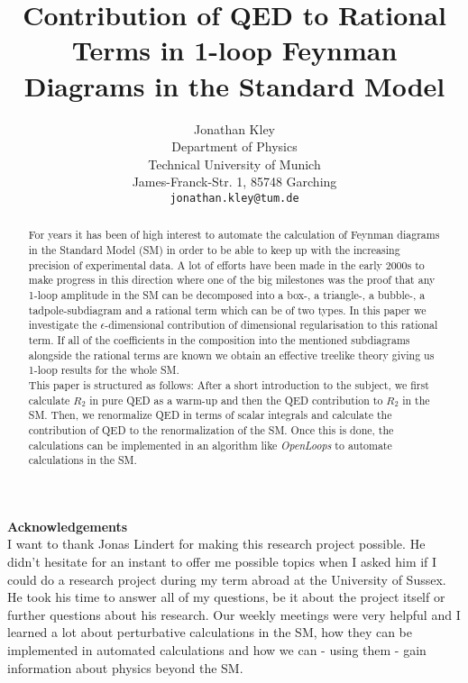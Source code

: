 \documentclass{article}
\title{Contribution of QED to Rational Terms in 1-loop Feynman Diagrams in the Standard Model}
\author{
  Jonathan Kley \\
  Department of Physics\\
  Technical University of Munich\\
  James-Franck-Str. 1, 85748 Garching \\
  \texttt{jonathan.kley@tum.de} \\
}
\numberwithin{equation}{section} %
\begin{document}
\maketitle

\begin{abstract}
For years it has been of high interest to automate the calculation of Feynman diagrams in the Standard Model (SM) in order to be able to keep up with the increasing precision of experimental data. A lot of efforts have been made in the early 2000s to make progress in this direction where one of the big milestones was the proof that any 1-loop amplitude in the SM can be decomposed into a box-, a triangle-, a bubble-, a tadpole-subdiagram and a rational term which can be of two types. In this paper we investigate the $\epsilon$-dimensional contribution of dimensional regularisation to this rational term. If all of the coefficients in the composition into the mentioned subdiagrams alongside the rational terms are known we obtain an effective treelike theory giving us 1-loop results for the whole SM. \\
This paper is structured as follows: After a short introduction to the subject, we first calculate $R_2$ in pure QED as a warm-up and then the QED contribution to $R_2$ in the SM. Then, we renormalize QED in terms of scalar integrals and calculate the contribution of QED to the renormalization of the SM. Once this is done, the calculations can be implemented in an algorithm like \textit{OpenLoops} to automate calculations in the SM.\end{abstract}



\newpage
\tableofcontents
\newpage





{\bf\Large Acknowledgements} \\

I want to thank Jonas Lindert for making this research project possible. He didn't hesitate for an instant to offer me possible topics when I asked him if I could do a research project during my term abroad at the University of Sussex. He took his time to answer all of my questions, be it about the project itself or further questions about his research. Our weekly meetings were very helpful and I learned a lot about perturbative calculations in the SM, how they can be implemented in automated calculations and how we can - using them - gain information about physics beyond the SM.



  

\end{document}
